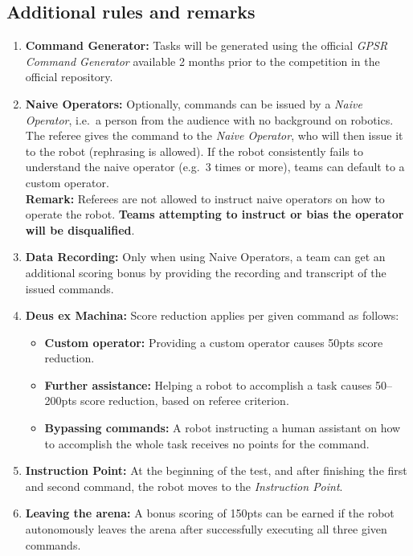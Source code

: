 %
%
\subsection*{Additional rules and remarks}
\begin{enumerate}[nosep]
	\item \textbf{Command Generator:} Tasks will be generated using the official \emph{GPSR Command Generator} available 2 months prior to the competition in the official repository.

	\item \textbf{Naive Operators:} Optionally, commands can be issued by a \emph{Naive Operator}, i.e.~a person from the audience with no background on robotics. The referee gives the command to the \emph{Naive Operator}, who will then issue it to the robot (rephrasing is allowed). If the robot consistently fails to understand the naive operator (e.g.~3 times or more), teams can default to a custom operator.
	\\[2mm]\textbf{Remark:} Referees are not allowed to instruct naive operators on how to operate the robot. \textbf{Teams attempting to instruct or bias the operator will be disqualified}.\\[2mm]

	\item \textbf{Data Recording:} Only when using Naive Operators, a team can get an additional scoring bonus by providing the recording and transcript of the issued commands.

	\item \textbf{Deus ex Machina:} Score reduction applies per given command as follows:
	\begin{itemize}[nosep]
	\item \textbf{Custom operator:} Providing a custom operator causes 50pts score reduction.
	\item \textbf{Further assistance:} Helping a robot to accomplish a task causes 50--200pts score reduction, based on referee criterion.
	\item \textbf{Bypassing commands:} A robot instructing a human assistant on how to accomplish the whole task receives no points for the command.
	\end{itemize}

	\item \textbf{Instruction Point:} At the beginning of the test, and after finishing the first and second command, the robot moves to the \textit{Instruction Point}.

	\item \textbf{Leaving the arena:} A bonus scoring of 150pts can be earned if the robot autonomously leaves the arena after successfully executing all three given commands.
\end{enumerate}


